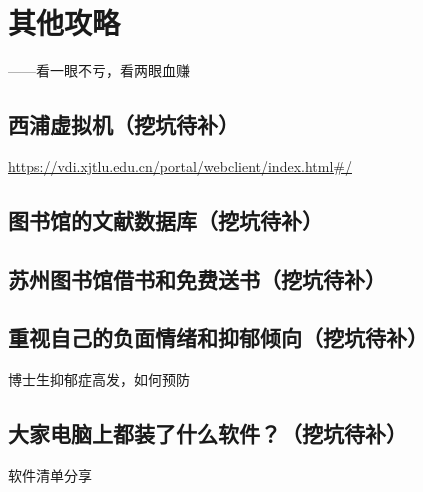 
\chapter{其他攻略}

\begin{flushright}
    ——看一眼不亏，看两眼血赚
\end{flushright}

 \clearpage

 \clearpage

 \clearpage

\section{西浦虚拟机（挖坑待补）}
\url{https://vdi.xjtlu.edu.cn/portal/webclient/index.html#/}
\section{图书馆的文献数据库（挖坑待补）}
\section{苏州图书馆借书和免费送书（挖坑待补）}
\section{重视自己的负面情绪和抑郁倾向（挖坑待补）}
博士生抑郁症高发，如何预防
\section{大家电脑上都装了什么软件？（挖坑待补）}
软件清单分享
